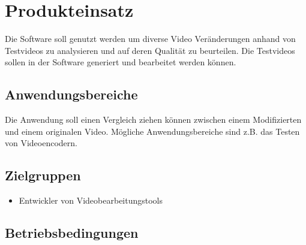 \chapter{Produkteinsatz}
Die Software soll genutzt werden um diverse Video Veränderungen anhand von Testvideos zu analysieren und auf deren Qualität zu beurteilen. 
Die Testvideos sollen in der Software generiert und bearbeitet werden können.
\section{Anwendungsbereiche}
Die Anwendung soll einen Vergleich ziehen können zwischen einem Modifizierten und einem originalen Video. Mögliche Anwendungsbereiche sind z.B. das Testen von Videoencodern.
\section{Zielgruppen}
\begin{itemize}

\item Entwickler von Videobearbeitungstools

\end{itemize}
\section{Betriebsbedingungen}
